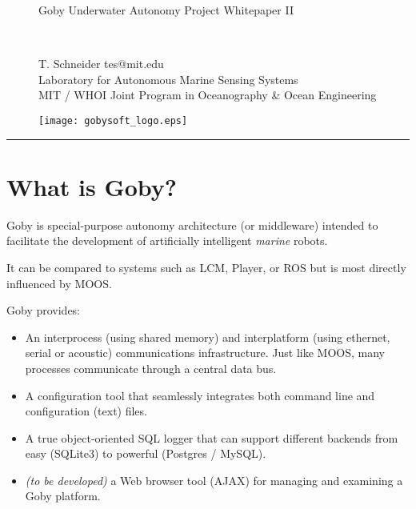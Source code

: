 \documentclass[11pt, letterpaper]{article}
\begin{document}
\begin{figure}[H]
\begin{minipage}[b]{0.55\linewidth}
\begin{Large}
Goby Underwater Autonomy Project Whitepaper II
\end{Large}
\vspace{0.5em}\\
\begin{footnotesize}
T. Schneider tes@mit.edu \\
Laboratory for Autonomous Marine Sensing Systems \\
MIT / WHOI Joint Program in Oceanography \& Ocean Engineering
\end{footnotesize}
\end{minipage}
\hfill
\begin{minipage}[b]{0.3\linewidth}
\begin{flushright}
\texttt{[image: gobysoft\_logo.eps]} 
\end{flushright}
\end{minipage}
\end{figure}

\vspace{0.5em}
\rule{\textwidth}{1pt}
\vspace{0.5em}

\section{What is Goby?}

Goby is special-purpose autonomy architecture (or middleware) intended to facilitate the development of artificially intelligent \textit{marine} robots.

It can be compared to systems such as LCM, Player, or ROS but is most directly influenced by MOOS.

Goby provides:

\begin{itemize}
\item An interprocess (using shared memory) and interplatform (using ethernet, serial or acoustic) communications infrastructure. Just like MOOS, many processes communicate through a central data bus.
\item A configuration tool that seamlessly integrates both command line and configuration (text) files.
\item A true object-oriented SQL logger that can support different backends from easy (SQLite3) to powerful (Postgres / MySQL).
\item \textit{(to be developed)} a Web browser tool (AJAX) for managing and examining a Goby platform.
\end{itemize}
\end{document}
